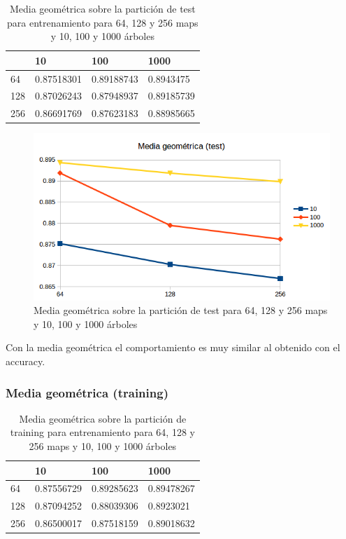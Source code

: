 \begin{table}[H]
	\centering
	\caption{Media geométrica sobre la partición de test para entrenamiento para 64, 128 y 256 maps y 10, 100 y 1000 árboles}
	\label{tab:media-geometrica-test}
	\begin{tabular}{l|lll|}
		\cline{2-4}
		& 10    & 100    & 1000    \\ \hline
		\multicolumn{1}{|l|}{64}  & 0.87518301 & 0.89188743 & 0.8943475  \\
		\multicolumn{1}{|l|}{128} & 0.87026243 & 0.87948937 & 0.89185739 \\
		\multicolumn{1}{|l|}{256} & 0.86691769 & 0.87623183 & 0.88985665 \\ \hline
	\end{tabular}
\end{table}

\begin{figure}[H]
	\centering
	\includegraphics[width=12cm]{img/media-geometrica-test}
	\caption{Media geométrica sobre la partición de test para 64, 128 y 256 maps y 10, 100 y 1000 árboles}
	\label{fig:media-geometrica-test}
\end{figure}

Con la media geométrica el comportamiento es muy similar al obtenido con el accuracy.

\newpage
\subsubsection{Media geométrica (training)}

\begin{table}[H]
	\centering
	\caption{Media geométrica sobre la partición de training para entrenamiento para 64, 128 y 256 maps y 10, 100 y 1000 árboles}
	\label{tab:media-geometrica-training}
	\begin{tabular}{l|lll|}
		\cline{2-4}
		& 10    & 100    & 1000    \\ \hline
		\multicolumn{1}{|l|}{64}  & 0.87556729 & 0.89285623 & 0.89478267 \\
		\multicolumn{1}{|l|}{128} & 0.87094252 & 0.88039306 & 0.8923021  \\
		\multicolumn{1}{|l|}{256} & 0.86500017 & 0.87518159 & 0.89018632 \\ \hline
	\end{tabular}
\end{table}

